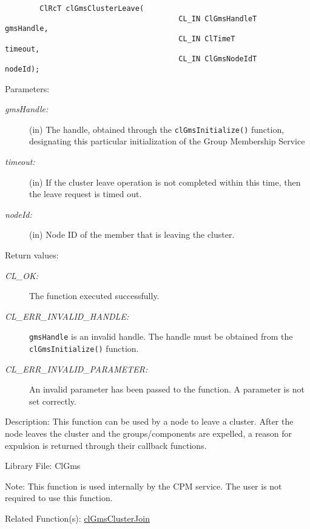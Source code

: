 \begin{flushleft}
\begin{Desc}
\footnotesize\begin{verbatim}        ClRcT clGmsClusterLeave(
                                		CL_IN ClGmsHandleT                        gmsHandle,
                                		CL_IN ClTimeT                             timeout,
                                		CL_IN ClGmsNodeIdT                        nodeId);
\end{verbatim}
\normalsize
\end{Desc}
\begin{Desc}
\item[Parameters:]
\begin{description}
\item[{\em gms\-Handle:}](in) The handle, obtained through the {\tt{clGmsInitialize()}} function, designating this particular initialization of the
Group Membership Service \item[{\em timeout:}](in) If the cluster leave operation is not completed within this time, then the leave request is timed out.
\item[{\em node\-Id:}](in) Node ID of the member that is leaving the cluster.\end{description}
\end{Desc}
\begin{Desc}
\item[Return values:]
\begin{description}
\item[{\em CL\_\-OK:}]The function executed successfully.
\item[{\em CL\_\-ERR\_\-INVALID\_\-HANDLE:}]{\tt{gmsHandle}} is an invalid handle. The handle must be obtained from the
{\tt{clGmsInitialize()}} function.
\item[{\em CL\_\-ERR\_\-INVALID\_\-PARAMETER:}]An invalid parameter has been passed to the function. A parameter is not set correctly.\end{description}
\end{Desc}
\begin{Desc}
\item[Description:]This function can be used by a node to leave a cluster. After the node leaves the cluster and the groups/components are expelled,
a reason for expulsion is returned through their callback functions.\end{Desc}
\begin{Desc}
\item[Library File:]Cl\-Gms\end{Desc}
\begin{Desc}
\item[Note:] This function is used internally by the CPM service. The user is not required to use this function.\end{Desc}
\begin{Desc}
\item[Related Function(s):]\hyperlink{pagegms201}{cl\-Gms\-Cluster\-Join} \end{Desc}
\newpage





\end{flushleft}

